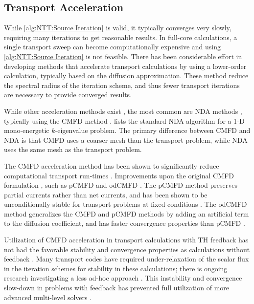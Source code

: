 {{        \subsection{Transport Acceleration}{\label{ssec:NTT:Transport Acceleration}
            While \cref{alg:NTT:Source Iteration} is valid, it typically converges very slowly, requiring many iterations to get reasonable results.
            In full-core calculations, a single transport sweep can become computationally expensive and using \cref{alg:NTT:Source Iteration} is not feasible.
            There has been considerable effort in developing methods that accelerate transport calculations by using a lower-order calculation, typically based on the diffusion approximation.
            These method reduce the spectral radius of the iteration scheme, and thus fewer transport iterations are necessary to provide converged results.

            While other acceleration methods exist \cite{Hebert2017}, the most common are \ac{NDA} methods \cite{Smith2002}, typically using the \ac{CMFD} method \cite{Smith1983}.
             lists the standard \ac{NDA} algorithm for a 1-D mono-energetic $k$-eigenvalue problem.
            The primary difference between \ac{CMFD} and \ac{NDA} is that \ac{CMFD} uses a coarser mesh than the transport problem, while \ac{NDA} uses the same mesh as the transport problem.

            The \ac{CMFD} acceleration method has been shown to significantly reduce computational transport run-times \cite{Smith2002,Anistratov2011,Collins2016}.
            Improvements upon the original \ac{CMFD} formulation \cite{Smith1983}, such as p\ac{CMFD} \cite{Cho2002} and od\ac{CMFD} \cite{Zhu2016}.
            The p\ac{CMFD} method preserves partial currents rather than net currents, and has been shown to be unconditionally stable for transport problems at fixed conditions \cite{Cho2002}.
            The od\ac{CMFD} method generalizes the \ac{CMFD} and p\ac{CMFD} methods by adding an artificial term to the diffusion coefficient, and has faster convergence properties than p\ac{CMFD} \cite{Zhu2016}.

            Utilization of \ac{CMFD} acceleration in transport calculations with \ac{TH} feedback has not had the favorable stability and convergence properties as calculations without feedback \cite{Kochunas2017}.
            Many transport codes have required under-relaxation of the scalar flux in the iteration schemes for stability in these calculations; there is ongoing research investigating a less ad-hoc approach \cite{Kochunas2017}.
            This instability and convergence slow-down in problems with feedback has prevented full utilization of more advanced multi-level solvers \cite{Kochunas2017,Yee2018a}.

}}}
